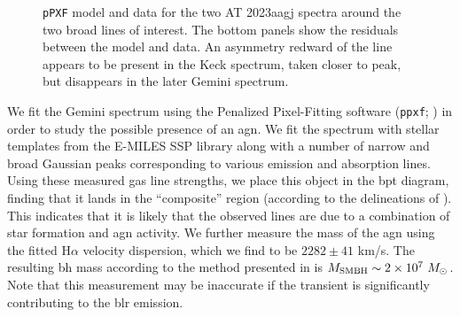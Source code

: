 \documentclass[twocolumn]{aastex631}
\begin{document}
\begin{figure}
     \centering
     \caption{
        \texttt{pPXF} model and data for the two AT 2023aagj spectra around the two broad lines of interest.
        The bottom panels show the residuals between the model and data. An asymmetry redward of the line appears to be present in the Keck spectrum, taken closer to peak, but disappears in the later Gemini spectrum. }
    \label{fig:asymmetry}
\end{figure}

 We fit the Gemini spectrum using the Penalized Pixel-Fitting software (\texttt{ppxf}; \citealt{2023MNRAS.526.3273C}) in order to study the possible presence of an \gls{agn}.
 We fit the spectrum with stellar templates from the E-MILES SSP library \citep{2016MNRAS.463.3409V} along with a number of narrow and broad Gaussian peaks corresponding to various emission and absorption lines. Using these measured gas line strengths, we place this object in the \gls{bpt} diagram, finding that it lands in the ``composite'' region (according to the delineations of \citealt{2001ApJ...556..121K, 2003MNRAS.346.1055K, 2006MNRAS.372..961K}).
 This indicates that it is likely that the observed lines are due to a combination of star formation and \gls{agn} activity.
 We further measure the mass of the \gls{agn} using the fitted H$\alpha$ velocity dispersion, which we find to be $2282\pm 41$ km/s. The resulting \gls{bh} mass according to the method presented in \citep{2005ApJ...630..122G} is $M_{\rm SMBH}\sim 2\times10^7~M_\odot$.
 Note that this measurement may be inaccurate if the transient is significantly contributing to the \gls{blr} emission.
\end{document}
